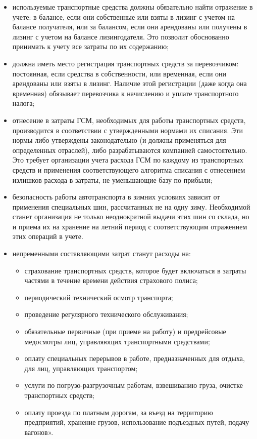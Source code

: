 \documentclass{lstu-diploma}
\begin{document}
\begin{itemize}
    \item используемые транспортные средства должны обязательно найти отражение
		в учете: в балансе, если они собственные или взяты в лизинг с учетом на
		балансе получателя, или за балансом, если они арендованы или получены в
		лизинг с учетом на балансе лизингодателя. Это позволит обоснованно
		принимать к учету все затраты по их содержанию;
	\item должна иметь место регистрация транспортных средств за перевозчиком:
		постоянная, если средства в собственности, или временная, если они
		арендованы или взяты в лизинг. Наличие этой регистрации (даже когда она
		временная) обязывает перевозчика к начислению и уплате транспортного
		налога;
	\item отнесение в затраты ГСМ, необходимых для работы транспортных средств,
		производится в соответствии с утвержденными нормами их списания. Эти
		нормы либо утверждены законодательно (и должны применяться для
		определенных отраслей), либо разрабатываются компанией самостоятельно.
		Это требует организации учета расхода ГСМ по каждому из транспортных
		средств и применения соответствующего алгоритма списания с отнесением
		излишков расхода в затраты, не уменьшающие базу по прибыли;
	\item безопасность работы автотранспорта в зимних условиях зависит от
		применения специальных шин, рассчитанных не на одну зиму. Необходимой
		станет организация не только неоднократной выдачи этих шин со склада, но
		и приема их на хранение на летний период с соответствующим отражением
		этих операций в учете.
	\item непременными составляющими затрат станут расходы на:
	
	\begin{itemize}
	    \item страхование транспортных средств, которое будет включаться в
			затраты частями в течение времени действия страхового полиса;
		\item периодический технический осмотр транспорта;
		\item проведение регулярного технического обслуживания;
		\item обязательные первичные (при приеме на работу) и предрейсовые
			медосмотры лиц, управляющих транспортными средствами;
		\item оплату специальных перерывов в работе, предназначенных для отдыха,
			для лиц, управляющих транспортом;
		\item услуги по погрузо-разгрузочным работам, взвешиванию груза, очистке
			транспортных средств;
		\item оплату проезда по платным дорогам, за въезд на территорию
			предприятий, хранение грузов, использование подъездных путей, подачу
			вагонов».
	\end{itemize}
\end{itemize}
\end{document}

